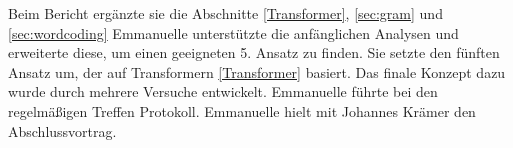 \label{AnteilEmmanuelle}
Beim Bericht ergänzte sie die Abschnitte \ref{Transformer}, \ref{sec:gram} und \ref{sec:wordcoding}
Emmanuelle unterstützte die anfänglichen Analysen und erweiterte diese, um einen geeigneten 5. Ansatz zu finden.
Sie setzte den fünften Ansatz um, der auf Transformern \ref{Transformer} basiert. Das finale Konzept dazu wurde durch mehrere Versuche entwickelt.
Emmanuelle führte bei den regelmäßigen Treffen Protokoll. Emmanuelle hielt mit Johannes Krämer den Abschlussvortrag.
